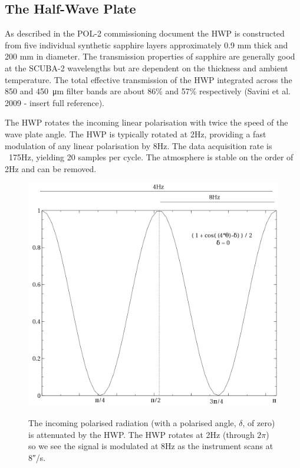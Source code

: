 \subsection*{The Half-Wave Plate}

As described in the POL-2 commissioning document the HWP is
constructed from five individual synthetic sapphire layers
approximately 0.9 mm thick and 200 mm in diameter. The transmission
properties of sapphire are generally good at the SCUBA-2 wavelengths
but are dependent on the thickness and ambient temperature. The total
effective transmission of the HWP integrated across the 850 and
\SI{450}{\micro\metre} filter bands are about 86\% and 57\%
respectively (Savini et al. 2009 - insert full reference).

The HWP rotates the incoming linear polarisation with twice the speed
of the wave plate angle.  The HWP is typically rotated at 2Hz,
providing a fast modulation of any linear polarisation by 8Hz.  The
data acquisition rate is ~175Hz, yielding 20 samples per cycle.  The
atmosphere is stable on the order of 2Hz and can be removed.


\begin{figure}[t!]
\begin{center}
\includegraphics[width=0.7\linewidth]{hwp-modulation.png}
\label{fig:hwpmodulation}
\caption [Attenuation of signal by HWP]{The incoming polarised
  radiation (with a polarised angle, $\delta$, of zero) is attenuated
  by the HWP.  The HWP rotates at 2Hz (through $2\pi$) so we see the
  signal is modulated at 8Hz as the instrument scans at
  8\si{\arcsecond}/s. }
\end{center}
\end{figure}


